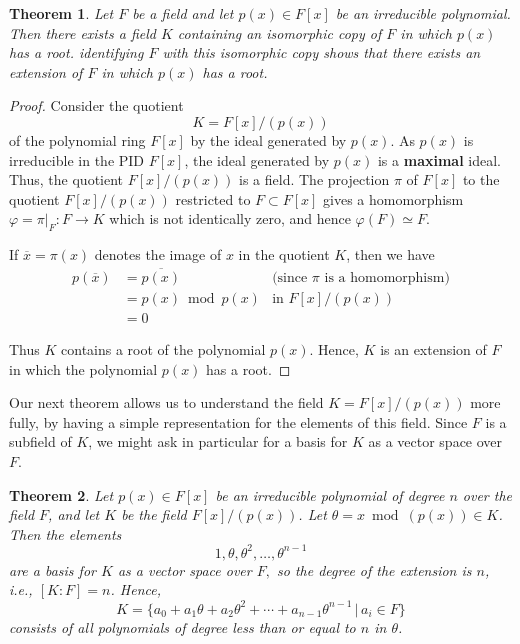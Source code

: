 \documentclass[10pt, oneside, reqno]{amsart}
\theoremstyle{plain}%
\newtheorem{thm}{Theorem}[section]
\theoremstyle{definition}
\theoremstyle{remark}
\newcommand{\xdeg}[2]{[#1 : #2]}
\begin{document}
\begin{thm}
    Let $F$ be a field and let $p(x) \in F[x]$ be an irreducible polynomial.  Then there exists a field $K$ containing an isomorphic copy of $F$ in which $p(x)$ has a root.  identifying $F$ with this isomorphic copy shows that there exists an extension of $F$ in which $p(x)$ has a root. 
\end{thm}
\begin{proof}
     Consider the quotient  \[
        K = F[x]/(p(x))
    \] of the polynomial ring $F[x]$ by the ideal generated by $p(x)$.  As $p(x)$ is irreducible in the PID $F[x]$, the ideal generated by $p(x)$ is a \textbf{maximal} ideal.  Thus, the quotient $F[x]/(p(x))$ is a field.  The projection $\pi$ of $F[x]$ to the quotient $F[x]/(p(x))$ restricted to $F \subset F[x]$ gives a homomorphism $\varphi = \pi |_{F} : F \rightarrow K$ which is not identically zero, and hence $\varphi(F) \simeq F$.  
    
    If $\overline{x} = \pi(x)$ denotes the image of $x$ in the quotient $K$, then we have \begin{align*}
        p(\overline{x}) &= \overline{p(x)}  &\text{(since $\pi$ is a homomorphism)} \\
                    &=  p(x) \bmod p(x)  &\text{in $F[x]/(p(x))$} \\
                    &= 0
    \end{align*}
    
    Thus $K$ contains a root of the polynomial $p(x)$.  Hence, $K$ is an extension of $F$ in which the polynomial $p(x)$ has a root. 
\end{proof}

Our next theorem allows us to understand the field $K = F[x]/(p(x))$ more fully, by having a simple representation for the elements of this field.  Since $F$ is a subfield of $K$, we might ask in particular for a basis for $K$ as a vector space over $F$.

\begin{thm}
    Let $p(x) \in F[x]$ be an irreducible polynomial of degree $n$ over the field $F$, and let $K$ be the field $F[x]/(p(x))$.  Let $\theta = x \bmod (p(x)) \in K$.  Then the elements \[
        1, \theta, \theta^2, \dots, \theta^{n-1}
    \]
    are a basis for $K$ as a vector space over $F,$ so the degree of the extension is $n$, i.e., $\xdeg{K}{F} = n$. Hence, \[
        K = \{ a_0 + a_1 \theta + a_2 \theta^2  + \cdots + a_{n-1} \theta^{n-1} \,| \, a_i \in F \}
    \] consists of all polynomials of degree less than or equal to $n$ in $\theta$.
\end{thm}
\end{document}
